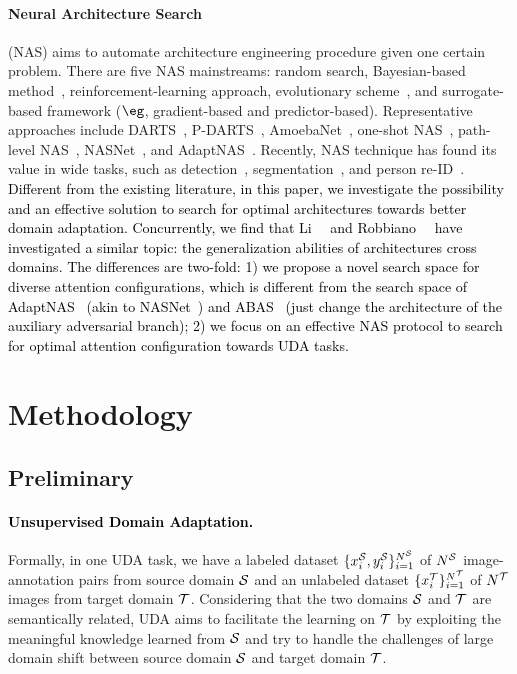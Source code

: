 \documentclass[10pt,twocolumn,letterpaper]{article}
\begin{document}
\paragraph{Neural Architecture Search} (NAS) aims to automate architecture engineering procedure given one certain problem.
There are five NAS mainstreams: random search, Bayesian-based method~\cite{falkner2018bohb}, reinforcement-learning approach, evolutionary scheme~\cite{back1996evolutionary}, and surrogate-based framework ($\eg$, gradient-based and predictor-based).
Representative approaches include DARTS~\cite{liu2018DARTS}, P-DARTS~\cite{chen2019progressive}, AmoebaNet~\cite{real2019EvoNAS}, one-shot NAS~\cite{bender2018oneshotNAS,guo2020SPOS}, path-level NAS~\cite{cai2018PathLevelNAS}, NASNet~\cite{zoph2018NASNet}, and AdaptNAS~\cite{li2020adapting}.
Recently, NAS technique has found its value in wide tasks, such as detection~\cite{chen2019detnas}, segmentation~\cite{liu2019AutoDeepLab}, and person re-ID~\cite{quan2019AutoReID}.
\textcolor{black}{Different from the existing literature, in this paper, we investigate the possibility and an effective solution to search for optimal architectures towards better domain adaptation. Concurrently, we find that Li~\etal~\cite{li2020adapting} and Robbiano~\etal~\cite{robbiano2021adversarial} have investigated a similar topic: the generalization abilities of architectures cross domains.
The differences are two-fold: 1) we propose a novel search space for diverse attention configurations, which is different from the search space of AdaptNAS~\cite{li2020adapting} (akin to NASNet~\cite{zoph2018NASNet}) and ABAS~\cite{robbiano2021adversarial} (just change the architecture of the auxiliary adversarial branch); 2) we focus on an effective NAS protocol to search for optimal attention configuration towards UDA tasks.
}









%
 
\section{Methodology}
\subsection{Preliminary}
\paragraph{\textcolor{black}{Unsupervised Domain Adaptation.}}
Formally, in one UDA task, we have a labeled dataset $\{ x^{\mathcal{S}}_{i}, y^{\mathcal{S}}_{i} \}_{i=1}^{N^{\mathcal{S}}}$ of $N^{\mathcal{S}}$ image-annotation pairs from source domain $\mathcal{S}$ and an unlabeled dataset $\{ x^{\mathcal{T}}_{i} \}_{i=1}^{N^{\mathcal{T}}}$ of $N^{\mathcal{T}}$ images from target domain $\mathcal{T}$.
Considering that the two domains $\mathcal{S}$ and $\mathcal{T}$ are semantically related, UDA aims to facilitate the learning on $\mathcal{T}$ by exploiting the meaningful knowledge learned from $\mathcal{S}$ and try to handle the challenges of large domain shift between source domain $\mathcal{S}$ and target domain $\mathcal{T}$.
\end{document}
